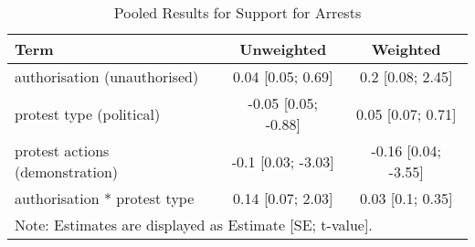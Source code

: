 \begin{table}[ht]
\centering
\begin{tabular}{lcc}
  \hline
Term & Unweighted & Weighted \\ 
  \hline
authorisation (unauthorised) & 0.04 [0.05; 0.69] & 0.2 [0.08; 2.45] \\ 
  protest type (political) & -0.05 [0.05; -0.88] & 0.05 [0.07; 0.71] \\ 
  protest actions (demonstration) & -0.1 [0.03; -3.03] & -0.16 [0.04; -3.55] \\ 
  authorisation * protest type & 0.14 [0.07; 2.03] & 0.03 [0.1; 0.35] \\ 
   \hline
\multicolumn{3}{l}{Note: Estimates are displayed as Estimate [SE; t-value].} \\
 \hline
\end{tabular}
\caption{Pooled Results for Support for Arrests} 
\end{table}
